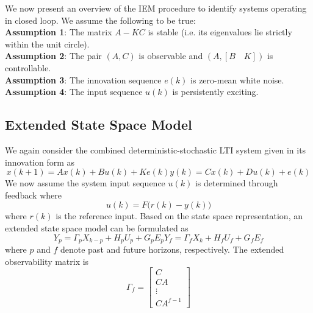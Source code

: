 We now present an overview of the IEM procedure to identify systems operating in closed loop. We assume the following to be true:\\
\textbf{Assumption 1}: The matrix $A - KC$ is stable (i.e. its eigenvalues lie strictly within the unit circle).\\
\textbf{Assumption 2}: The pair $(A,C)$ is observable and $(A, [B \quad K])$ is controllable.\\
\textbf{Assumption 3}: The innovation sequence $e(k)$ is zero-mean white noise.\\
\textbf{Assumption 4}: The input sequence $u(k)$ is persistently exciting.

\subsection{Extended State Space Model}\label{sec:extended_state_space_model}
We again consider the combined deterministic-stochastic LTI system given in its innovation form as
\begin{subequations}
\begin{equation}x(k+1) = Ax(k) + Bu(k) + Ke(k)\end{equation}
\begin{equation}y(k) = Cx(k) + Du(k) + e(k)\end{equation}
\end{subequations}
We now assume the system input sequence $u(k)$ is determined through feedback where
\begin{equation*}
u(k) = F\big( r(k) - y(k)\big)
\end{equation*}
where $r(k)$ is the reference input. Based on the state space representation, an extended state space model can be formulated as
\begin{subequations}
\begin{equation}Y_p = \Gamma_p X_{k-p} + H_p U_p + G_p E_p\end{equation}
\begin{equation}Y_f = \Gamma_f X_k + H_f U_f + G_f E_f\end{equation}
\end{subequations}
where $p$ and $f$ denote past and future horizons, respectively. The extended observability matrix is
\begin{equation*}
\Gamma_f = \begin{bmatrix}C\\ CA\\ \vdots\\ CA^{f-1}\end{bmatrix}
\end{equation*}
